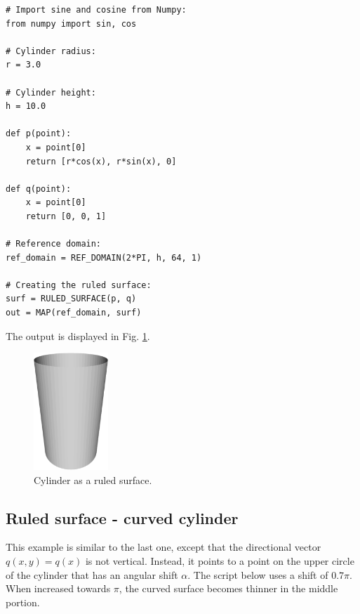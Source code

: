 \begin{bbox}
\begin{verbatim}
# Import sine and cosine from Numpy:
from numpy import sin, cos

# Cylinder radius:
r = 3.0

# Cylinder height:
h = 10.0

def p(point):
    x = point[0]
    return [r*cos(x), r*sin(x), 0]
  
def q(point):
    x = point[0]
    return [0, 0, 1]

# Reference domain:  
ref_domain = REF_DOMAIN(2*PI, h, 64, 1)

# Creating the ruled surface:
surf = RULED_SURFACE(p, q)
out = MAP(ref_domain, surf)
\end{verbatim}
\end{bbox}
\vspace{6mm}

\noindent
The output is displayed in Fig. \ref{fig:curves-8}.\\

\begin{figure}[!ht]
\begin{center}
\includegraphics[width=0.25\textwidth]{img/curves-8.png}
\end{center}
\vspace{-4mm}
\caption{Cylinder as a ruled surface.}
\label{fig:curves-8}
\end{figure}

\subsection{Ruled surface - curved cylinder}

This example is similar to the last one, except that the directional
vector $q(x, y) = q(x)$ is not vertical. Instead, it points 
to a point on the upper circle of the cylinder that has an 
angular shift $\alpha$. The script below uses a shift of $0.7\pi$. 
When increased towards $\pi$, the curved surface becomes thinner 
in the middle portion. \\

